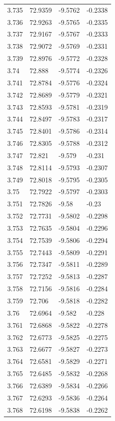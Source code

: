 \begin{tabular}{llll}
3.735 & 72.9359 & -9.5762 & -0.2338 \\
3.736 & 72.9263 & -9.5765 & -0.2335 \\
3.737 & 72.9167 & -9.5767 & -0.2333 \\
3.738 & 72.9072 & -9.5769 & -0.2331 \\
3.739 & 72.8976 & -9.5772 & -0.2328 \\
3.74 & 72.888 & -9.5774 & -0.2326 \\
3.741 & 72.8784 & -9.5776 & -0.2324 \\
3.742 & 72.8689 & -9.5779 & -0.2321 \\
3.743 & 72.8593 & -9.5781 & -0.2319 \\
3.744 & 72.8497 & -9.5783 & -0.2317 \\
3.745 & 72.8401 & -9.5786 & -0.2314 \\
3.746 & 72.8305 & -9.5788 & -0.2312 \\
3.747 & 72.821 & -9.579 & -0.231 \\
3.748 & 72.8114 & -9.5793 & -0.2307 \\
3.749 & 72.8018 & -9.5795 & -0.2305 \\
3.75 & 72.7922 & -9.5797 & -0.2303 \\
3.751 & 72.7826 & -9.58 & -0.23 \\
3.752 & 72.7731 & -9.5802 & -0.2298 \\
3.753 & 72.7635 & -9.5804 & -0.2296 \\
3.754 & 72.7539 & -9.5806 & -0.2294 \\
3.755 & 72.7443 & -9.5809 & -0.2291 \\
3.756 & 72.7347 & -9.5811 & -0.2289 \\
3.757 & 72.7252 & -9.5813 & -0.2287 \\
3.758 & 72.7156 & -9.5816 & -0.2284 \\
3.759 & 72.706 & -9.5818 & -0.2282 \\
3.76 & 72.6964 & -9.582 & -0.228 \\
3.761 & 72.6868 & -9.5822 & -0.2278 \\
3.762 & 72.6773 & -9.5825 & -0.2275 \\
3.763 & 72.6677 & -9.5827 & -0.2273 \\
3.764 & 72.6581 & -9.5829 & -0.2271 \\
3.765 & 72.6485 & -9.5832 & -0.2268 \\
3.766 & 72.6389 & -9.5834 & -0.2266 \\
3.767 & 72.6293 & -9.5836 & -0.2264 \\
3.768 & 72.6198 & -9.5838 & -0.2262 \\

\end{tabular}
